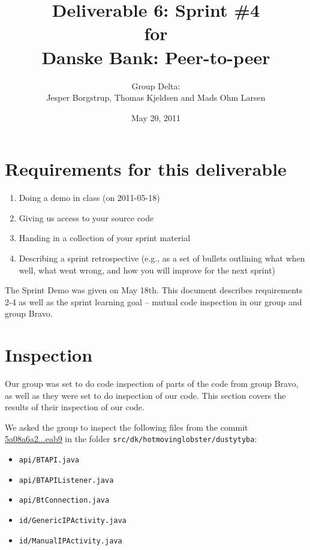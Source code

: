 \documentclass[a4paper,11pt]{article}
\title{Deliverable 6: Sprint \#4\\\small{for}\\\small{Danske Bank: Peer-to-peer}}
\author{ Group Delta:\\Jesper Borgstrup, Thomas Kjeldsen and Mads Ohm Larsen }
\date{May 20, 2011}
\begin{document}
\ifpdf
{}
\else
{}
\fi

\maketitle



\section{Requirements for this deliverable}
\begin{enumerate}
\item Doing a demo in class (on 2011-05-18)
\item Giving us access to your source code
\item Handing in a collection of your sprint material
\item Describing a sprint retrospective (e.g., as a set of bullets outlining what
when well, what went wrong, and how you will improve for the next sprint)
\end{enumerate}

The Sprint Demo was given on May 18th. This document describes requirements 2-4 as well as the sprint learning goal -- mutual code inspection in our group and group Bravo.


\section{Inspection}
Our group was set to do code inspection of parts of the code from group Bravo, as well as they were set to do inspection of our code. This section covers the results of their inspection of our code.

We asked the group to inspect the following files from the commit \href{https://github.com/omegahm/DBP2P/commit/https://github.com/omegahm/DBP2P/commit/5a08a6a2c3a4d11663ae10a8ee2b371f69f2eab9c3a4d11663ae10a8ee2b371f69f2eab9}{5a08a6a2...eab9} in the folder {\tt src/dk/hotmovinglobster/dustytyba}:

\begin{itemize}
\item {\tt api/BTAPI.java}
\item {\tt api/BTAPIListener.java}
\item {\tt api/BtConnection.java}
\item {\tt id/GenericIPActivity.java}
\item {\tt id/ManualIPActivity.java}
\end{itemize}
\end{document}
